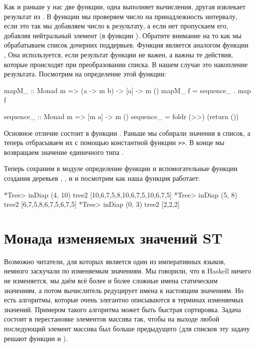 Как и раньше у нас две функции, одна выполняет вычисления,
другая извлекает результат из . В функции 
 мы проверяем число на принадлежность интервалу, если
это так мы добавляем число к результату, а если нет пропускаем
его, добавляя нейтральный элемент (в функции ). 
Обратите внимание на то как мы обрабатываем список дочерних 
поддервьев. Функция  является аналогом функции ,
Она используется, если результат функции не важен, а важны
те действия, которые происходят при преобразовании списка.
В нашем случае это накопление результата. Посмотрим на определение
этой функции:

\begin{code}
mapM_ :: Monad m => (a -> m b) ->  [a] -> m ()
mapM_ f = sequence_ . map f

sequence_ :: Monad m => [m a] -> m ()
sequence_ = foldr (>>) (return ())
\end{code}

Основное отличие состоит в функции . Раньше
мы собирали значения в список, а теперь отбрасываем их
с помощью константной функции \verb!>>!. В конце мы возвращаем
значение единичного типа \In{()}. 

Теперь сохраним в модуле  определение функции и
вспомогательные функции создания деревьев , ,
и  и посмотрим как наша функция работает:

\begin{code}
*Tree> inDiap (4, 10) tree2
[10,6,7,5,8,10,6,7,5,10,6,7,5]
*Tree> inDiap (5, 8) tree2
[6,7,5,8,6,7,5,6,7,5]
*Tree> inDiap (0, 3) tree2
[2,2,2]
\end{code}

\section{Монада изменяемых значений ST}

Возможно читатели, для которых  является
один из императивных языков, немного заскучали по изменяемым
значениям. Мы говорили, что в Haskell ничего не изменяется,
мы даём всё более и более сложные имена статическим значениям,
а потом вычислитель редуцирует имена к настоящим значениям.
Но есть алгоритмы, которые очень элегантно описываются в терминах
изменяемых значений. Примером такого алгоритма может быть
быстрая сортировка. Задача состоит в перестановке элементов
массива так, чтобы на выходе любой последующий элемент массива 
был больше предыдущего (для списков эту задачу решают функции
 и ).  

